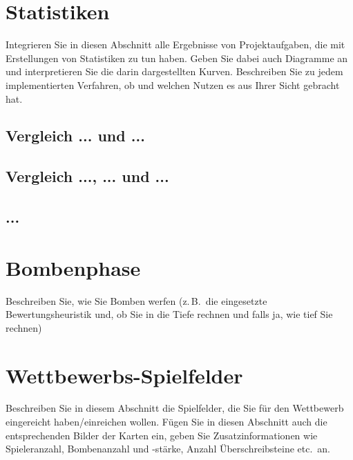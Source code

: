\documentclass[12pt,a4paper]{article}
\begin{document}
\newpage
\section{Statistiken}
Integrieren Sie in diesen Abschnitt alle Ergebnisse von Projektaufgaben, die mit Erstellungen von Statistiken zu tun haben. Geben Sie dabei auch Diagramme an und interpretieren Sie die darin dargestellten Kurven. Beschreiben Sie zu jedem implementierten Verfahren, ob und welchen Nutzen es aus Ihrer Sicht gebracht hat.

\subsection{Vergleich ... und ...}

\subsection{Vergleich ..., ... und ...}

\subsection{...}


\newpage
\section{Bombenphase}
Beschreiben Sie, wie Sie Bomben werfen (z.\,B.\ die eingesetzte Bewertungsheuristik und, ob Sie in die Tiefe rechnen und falls ja, wie tief Sie rechnen)


\newpage
\section{Wettbewerbs-Spielfelder}
Beschreiben Sie in diesem Abschnitt die Spielfelder, die Sie für den Wettbewerb eingereicht haben/einreichen wollen. Fügen Sie in diesen Abschnitt auch die entsprechenden Bilder der Karten ein, geben Sie Zusatzinformationen wie Spieleranzahl, Bombenanzahl und -stärke, Anzahl Überschreibsteine etc.\ an.
\end{document}
